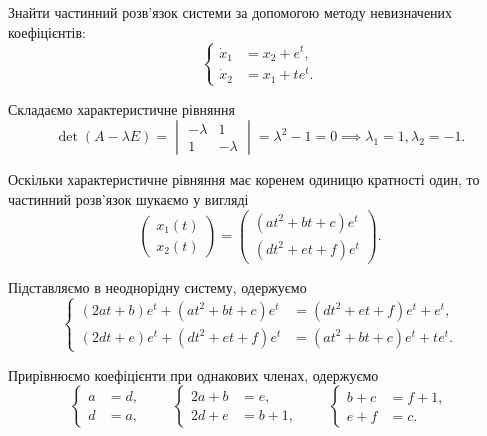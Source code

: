 \begin{example}
	Знайти частинний розв'язок системи за допомогою методу невизначених коефіцієнтів:
	\begin{equation*}
		\left\{
			\begin{aligned}
				\dot x_1 &= x_2 + e^t, \\
				\dot x_2 &= x_1 + t e^t.
			\end{aligned}
		\right.
	\end{equation*}
\end{example}

\begin{solution}
	Складаємо характеристичне рівняння
	\begin{equation*}
		\det (A - \lambda E) = \begin{vmatrix} - \lambda & 1 \\ 1 & - \lambda \end{vmatrix} = \lambda^2 - 1 = 0 \implies \lambda_1 = 1, \lambda_2 = -1.
	\end{equation*}

	Оскільки характеристичне рівняння має коренем одиницю кратності один, то частинний розв'язок шукаємо у вигляді
	\begin{equation*}
		\begin{pmatrix} x_1(t) \\ x_2(t) \end{pmatrix} = \begin{pmatrix} (a t^2 + b t + c) e^t \\ (d t^2 + e t + f) e^t \end{pmatrix}.
	\end{equation*}

	Підставляємо в неоднорідну систему, одержуємо
	\begin{equation*}
		\left\{
			\begin{aligned}
				(2 a t + b) e^t + (a t^2 + b t + c) e^t &= (d t^2 + e t + f) e^t + e^t, \\
				(2 d t + e) e^t + (d t^2 + e t + f) e^t &= (a t^2 + b t + c) e^t + t e^t.
			\end{aligned}
		\right.
	\end{equation*}

	Прирівнюємо коефіцієнти при однакових членах, одержуємо
	\begin{equation*}
		\left\{
			\begin{aligned}
				a &= d, \\
				d &= a,
			\end{aligned}
		\right. \qquad \left\{
			\begin{aligned}
				2 a + b &= e, \\
				2 d + e &= b + 1,
			\end{aligned}
		\right. \qquad \left\{
			\begin{aligned}
				b + c &= f + 1, \\
				e + f &= c.
			\end{aligned}
		\right.
	\end{equation*}


\end{solution}
